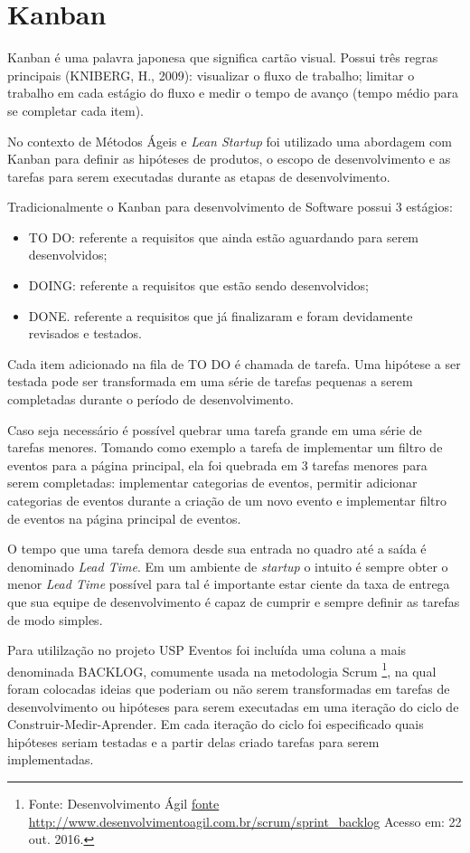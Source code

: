 \section{Kanban}
\par Kanban é uma palavra japonesa que significa cartão visual. Possui três regras principais (KNIBERG, H., 2009): visualizar o fluxo de trabalho; limitar o trabalho em cada estágio do fluxo e medir o tempo de avanço (tempo médio para se completar cada item).    \citep{francisco:14}
\par No contexto de Métodos Ágeis e \emph{Lean Startup} foi utilizado uma abordagem com Kanban para definir as hipóteses de produtos, o escopo de desenvolvimento e as tarefas para serem executadas durante as etapas de desenvolvimento.
\par Tradicionalmente o Kanban para desenvolvimento de Software possui 3 estágios: \citep{francisco:14}
\begin{itemize}
        \item TO DO: referente a requisitos que ainda estão aguardando para serem
desenvolvidos;
        \item DOING: referente a requisitos que estão sendo desenvolvidos;
        \item DONE. referente a requisitos que já finalizaram e foram devidamente
revisados e testados.
\end{itemize}
\par Cada item adicionado na fila de TO DO é chamada de tarefa. Uma hipótese a ser testada pode ser transformada em uma série de tarefas pequenas a serem completadas durante o período de desenvolvimento.
\par Caso seja necessário é possível quebrar uma tarefa grande em uma série de tarefas menores. Tomando como exemplo a tarefa de implementar um filtro de eventos para a página principal, ela foi quebrada em 3 tarefas menores para serem completadas: implementar categorias de eventos, permitir adicionar categorias de eventos durante a criação de um novo evento e implementar filtro de eventos na página principal de eventos.
\par O tempo que uma tarefa demora desde sua entrada no quadro até a saída é denominado \emph{Lead Time}. Em um ambiente de \emph{startup} o intuito é sempre obter o menor \emph{Lead Time} possível para tal é importante estar ciente da taxa de entrega que sua equipe de desenvolvimento é capaz de cumprir e sempre definir as tarefas de modo simples.
\par Para utililzação no projeto USP Eventos foi incluída uma coluna a mais denominada BACKLOG, comumente usada na metodologia Scrum \footnote{Fonte: Desenvolvimento Ágil \url{fonte http://www.desenvolvimentoagil.com.br/scrum/sprint_backlog} Acesso em: 22 out. 2016.}, na qual foram colocadas ideias que poderiam ou não serem transformadas em tarefas de desenvolvimento ou hipóteses para serem executadas em uma iteração do ciclo de Construir-Medir-Aprender. Em cada iteração do ciclo foi especificado quais hipóteses seriam testadas e a partir delas criado tarefas para serem implementadas.
